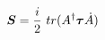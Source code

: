 \begin{equation}
\mbox{\boldmath$S$}= \frac{i}{2}~tr(A^\dag \mbox{\boldmath$\tau$}\dot{A}) 
\end{equation}

